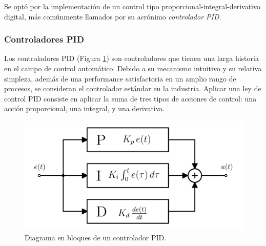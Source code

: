 Se optó por la implementación de un control tipo proporcional-integral-derivativo digital, más comúnmente llamados por su acrónimo \emph{controlador PID}.

\subsubsection{Controladores PID}
\label{diseno-controladores-pid}

Los controladores PID (Figura \ref{esquema-pid}) son controladores que tienen una larga historia en el campo de control automático. Debido a su mecanismo intuitivo y su relativa simpleza, además de una performance satisfactoria en un amplio rango de procesos, se consideran el controlador estándar en la industria. Aplicar una ley de control PID consiste en aplicar la suma de tres tipos de acciones de control: una acción proporcional, una integral, y una derivativa.

\begin{figure}[hbt!]
  \centering
  \includegraphics[width=0.45\columnwidth]{Imágenes/Diseño del control/Controlador PID.pdf}
  \caption{Diagrama en bloques de un controlador PID.}
  \label{esquema-pid}
\end{figure} 


